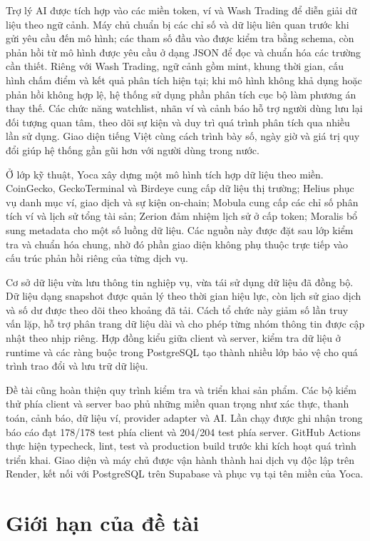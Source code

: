 Trợ lý AI được tích hợp vào các miền token, ví và Wash Trading để diễn giải dữ liệu theo ngữ cảnh. Máy chủ chuẩn bị các chỉ số và dữ liệu liên quan trước khi gửi yêu cầu đến mô hình; các tham số đầu vào được kiểm tra bằng schema, còn phản hồi từ mô hình được yêu cầu ở dạng JSON để đọc và chuẩn hóa các trường cần thiết. Riêng với Wash Trading, ngữ cảnh gồm mint, khung thời gian, cấu hình chấm điểm và kết quả phân tích hiện tại; khi mô hình không khả dụng hoặc phản hồi không hợp lệ, hệ thống sử dụng phần phân tích cục bộ làm phương án thay thế. Các chức năng watchlist, nhãn ví và cảnh báo hỗ trợ người dùng lưu lại đối tượng quan tâm, theo dõi sự kiện và duy trì quá trình phân tích qua nhiều lần sử dụng. Giao diện tiếng Việt cùng cách trình bày số, ngày giờ và giá trị quy đổi giúp hệ thống gần gũi hơn với người dùng trong nước.

Ở lớp kỹ thuật, Yoca xây dựng một mô hình tích hợp dữ liệu theo miền. CoinGecko, GeckoTerminal và Birdeye cung cấp dữ liệu thị trường; Helius phục vụ danh mục ví, giao dịch và sự kiện on-chain; Mobula cung cấp các chỉ số phân tích ví và lịch sử tổng tài sản; Zerion đảm nhiệm lịch sử ở cấp token; Moralis bổ sung metadata cho một số luồng dữ liệu. Các nguồn này được đặt sau lớp kiểm tra và chuẩn hóa chung, nhờ đó phần giao diện không phụ thuộc trực tiếp vào cấu trúc phản hồi riêng của từng dịch vụ.

Cơ sở dữ liệu vừa lưu thông tin nghiệp vụ, vừa tái sử dụng dữ liệu đã đồng bộ. Dữ liệu dạng snapshot được quản lý theo thời gian hiệu lực, còn lịch sử giao dịch và số dư được theo dõi theo khoảng đã tải. Cách tổ chức này giảm số lần truy vấn lặp, hỗ trợ phân trang dữ liệu dài và cho phép từng nhóm thông tin được cập nhật theo nhịp riêng. Hợp đồng kiểu giữa client và server, kiểm tra dữ liệu ở runtime và các ràng buộc trong PostgreSQL tạo thành nhiều lớp bảo vệ cho quá trình trao đổi và lưu trữ dữ liệu.

Đề tài cũng hoàn thiện quy trình kiểm tra và triển khai sản phẩm. Các bộ kiểm thử phía client và server bao phủ những miền quan trọng như xác thực, thanh toán, cảnh báo, dữ liệu ví, provider adapter và AI. Lần chạy được ghi nhận trong báo cáo đạt 178/178 test phía client và 204/204 test phía server. GitHub Actions thực hiện typecheck, lint, test và production build trước khi kích hoạt quá trình triển khai. Giao diện và máy chủ được vận hành thành hai dịch vụ độc lập trên Render, kết nối với PostgreSQL trên Supabase và phục vụ tại tên miền của Yoca.

\section{Giới hạn của đề tài}

